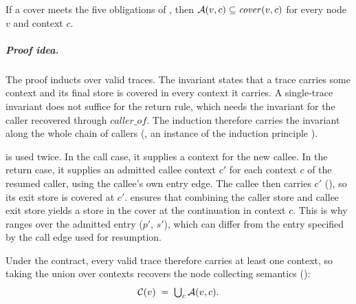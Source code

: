 \begin{theorem}
\label{thm:contract}
If a cover meets the five obligations of , then
$\mathcal{A}(v, c) \subseteq \mathit{cover}(v, c)$ for every node $v$ and context $c$.
\end{theorem}

\subparagraph*{Proof idea.}
The proof inducts over valid traces. The invariant states that a trace
carries some context and its final store is covered in every context it carries. A single-trace invariant does not suffice for the return rule, which
needs the invariant for the caller recovered through $\mathit{caller\_of}$.
The induction therefore carries the invariant along the whole chain of
callers (, an instance of the induction
principle ).

 is used twice. In the call case, it supplies a context for the
new callee. In the return case, it supplies an admitted callee context $c'$
for each context $c$ of the resumed caller, using the callee's own entry edge.
The callee then carries $c'$ (),
so its exit store is covered at $c'$.  ensures that combining
the caller store and callee exit store yields a store in the cover at the
continuation in context $c$. This is why  ranges over the admitted
entry ($p'$, $s'$), which can differ from the entry specified by the call edge used for resumption.

Under the contract, every valid trace therefore carries at least one context,
so taking the union over contexts recovers the node collecting semantics
():
\[
\mathcal{C}(v) \;=\; \textstyle\bigcup_c \mathcal{A}(v, c).
\]
